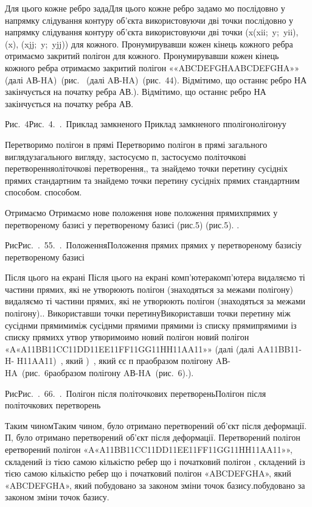 \documentclass[12pt,a4paper]{article}
\begin{document}
\par
Для цього кожне ребро задаДля цього кожне ребро задамо мо послідовно у напрямку слідування контуру об’єкта використовуючи дві точки послідовно у напрямку слідування контуру об’єкта використовуючи дві точки (x(xii; y; yii), (x), (xjj; y; yjj)) для кожного. Пронумирувавши кожен кінець кожного ребра отримаємо закритий полігон  для кожного. Пронумирувавши кожен кінець кожного ребра отримаємо закритий полігон ««ABCDEFGHAABCDEFGHA»» (далі AВ-HA) (рис.  (далі AВ-HA) (рис. 44). Відмітимо, що останнє ребро НА закінчується на початку ребра АВ.). Відмітимо, що останнє ребро НА закінчується на початку ребра АВ.
\par
Рис. 4Рис. 4. . Приклад замкненого Приклад замкненого пполігонолігонуу
\par
Перетворимо полігон в прямі Перетворимо полігон в прямі загального виглядузагального вигляду, застосуємо п, застосуємо політочкові перетворенняоліточкові перетворення,, та знайдемо точки перетину сусідніх прямих стандартним та знайдемо точки перетину сусідніх прямих стандартним способом.  способом.
\par
Отримаємо Отримаємо нове положення нове положення прямихпрямих у перетвореному базисі у перетвореному базисі (рис.5) (рис.5). .
\par
РисРис. . 55. . ПоложенняПоложення  прямих прямих у перетвореному базисіу перетвореному базисі
\par
Після цього на екрані Після цього на екрані комп’ютеракомп’ютера видаляємо ті частини прямих, які не утворюють полігон (знаходяться за межами полігону) видаляємо ті частини прямих, які не утворюють полігон (знаходяться за межами полігону)..  Використавши точки перетинуВикориставши точки перетину  між сусіднми прямимиміж сусіднми прямими  прямими із списку прямипрямими із списку прямихх утвор утворимоимо новий полігон  новий полігон «A«A11BB11CC11DD11EE11FF11GG11HH11AA11»»  (далі (далі AA11BB11- H- H11AA11) , який ) , який єє п праобразом полігону AВ-HA (рис. 6раобразом полігону AВ-HA (рис. 6).).
\par
РисРис. . 66. . Полігон після політочкових перетвореньПолігон після політочкових перетворень
\par
Таким чиномТаким чином, було отримано перетворений об’єкт після деформації.  П, було отримано перетворений об’єкт після деформації.  Перетворений полігон еретворений полігон «A«A11BB11CC11DD11EE11FF11GG11HH11AA11»», складений із тією самою кількістю ребер що і початковий полігон , складений із тією самою кількістю ребер що і початковий полігон «ABCDEFGHA», який «ABCDEFGHA», який побудовано за законом зміни точок базису.побудовано за законом зміни точок базису.
\end{document}
